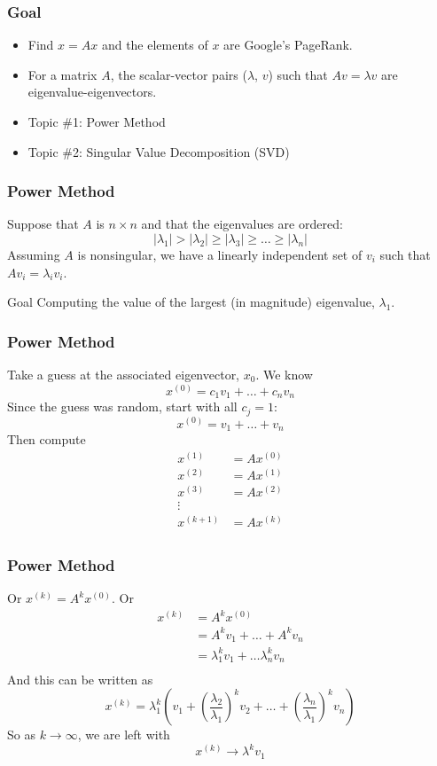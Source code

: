 \documentclass[10pt]{beamer}
\begin{document}
\begin{frame}
\frametitle{Goal}
  \begin{itemize}
    \item Find $x = Ax$ and the elements of $x$ are Google's PageRank.
    \item For a matrix $A$, the scalar-vector pairs ($\lambda$, $v$) such that
$Av=\lambda v$ are eigenvalue-eigenvectors.
    \item Topic \#1: Power Method
    \item Topic \#2: Singular Value Decomposition (SVD)
  \end{itemize}
\end{frame}
\begin{frame}
\frametitle{Power Method}
Suppose that $A$ is $n \times n$ and that the eigenvalues are ordered:
\[
|\lambda_1| > |\lambda_2| \geq |\lambda_3| \geq \dots \geq |\lambda_n|
\]
Assuming $A$ is nonsingular, we have a linearly independent set of $v_i$ such
that $A v_i = \lambda_i v_i$.
\bigskip

\begin{block}{Goal}
    Computing the value of the largest (in magnitude) eigenvalue, $\lambda_1$.
\end{block}
\end{frame}
\begin{frame}
\frametitle{Power Method}
Take a guess at the associated eigenvector, $x_0$.  We know
\[
x^{(0)} = c_1 v_1 + \dots + c_n v_n
\]
Since the guess was random, start with all $c_j=1$:
\[
x^{(0)} = v_1 + \dots + v_n
\]
Then compute
\begin{align*}
    x^{(1)} & = A x^{(0)}\\
    x^{(2)} & = A x^{(1)}\\
    x^{(3)} & = A x^{(2)}\\
     \vdots & \\
    x^{(k+1)} & = A x^{(k)}\\
\end{align*}
\end{frame}
\begin{frame}
\frametitle{Power Method}
Or $x^{(k)} = A^k x^{(0)}$.  Or
\begin{align*}
    x^{(k)} & = A^k x^{(0)}\\
            & = A^k v_1 + \dots + A^k v_n\\
            & = \lambda_1^k v_1 + \dots \lambda_n^k v_n\\
\end{align*}
And this can be written as
\[
x^{(k)} = \lambda_1^k\left( v_1 + \left(\frac{\lambda_2}{\lambda_1}\right)^k v_2
+ \dots + \left(\frac{\lambda_n}{\lambda_1}\right)^k v_n \right)
\]
So as $k\rightarrow\infty$, we are left with
\[
x^{(k)} \rightarrow \lambda^k v_1
\]
\end{frame}
\end{document}
